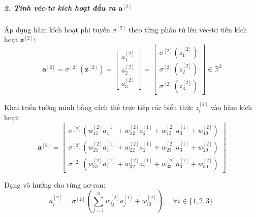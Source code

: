 \subparagraph{2. Tính véc-tơ kích hoạt đầu ra $\mathbf{a}^{[2]}$\\}
Áp dụng hàm kích hoạt phi tuyến $\sigma^{[2]}$ theo từng phần tử lên véc-tơ tiền kích hoạt $\mathbf{z}^{[2]}$:
\begin{equation}
    \mathbf{a}^{[2]} = \sigma^{[2]}\left(\mathbf{z}^{[2]}\right) 
    = \begin{bmatrix} a_1^{[2]} \\ a_2^{[2]} \\ a_3^{[2]} \end{bmatrix} 
    = \begin{bmatrix} 
        \sigma^{[2]}\left(z_1^{[2]}\right) \\ 
        \sigma^{[2]}\left(z_2^{[2]}\right) \\ 
        \sigma^{[2]}\left(z_3^{[2]}\right) 
    \end{bmatrix} \in \mathbb{R}^3
\end{equation}

Khai triển tường minh bằng cách thế trực tiếp các biểu thức $z_i^{[2]}$ vào hàm kích hoạt:
\begin{equation}
    \mathbf{a}^{[2]} = \begin{bmatrix} 
        \sigma^{[2]}\left( w_{11}^{[2]} a_1^{[1]} + w_{12}^{[2]} a_2^{[1]} + w_{13}^{[2]} a_3^{[1]} + w_{10}^{[2]} \right) \\
        \sigma^{[2]}\left( w_{21}^{[2]} a_1^{[1]} + w_{22}^{[2]} a_2^{[1]} + w_{23}^{[2]} a_3^{[1]} + w_{20}^{[2]} \right) \\
        \sigma^{[2]}\left( w_{31}^{[2]} a_1^{[1]} + w_{32}^{[2]} a_2^{[1]} + w_{33}^{[2]} a_3^{[1]} + w_{30}^{[2]} \right)
    \end{bmatrix}
\end{equation}

Dạng vô hướng cho từng nơ-ron:
\begin{equation}
    a_i^{[2]} = \sigma^{[2]}\left( \sum_{j=1}^{3} w_{ij}^{[2]} a_j^{[1]} + w_{i0}^{[2]} \right), \quad \forall i \in \{1, 2, 3\}.
\end{equation}
